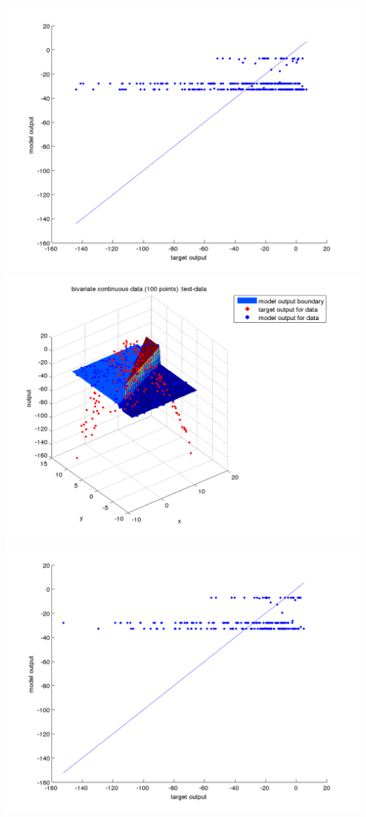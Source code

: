 \documentclass[fleqn]{article}
\begin{document}
\includegraphics[scale=0.4]{./pics/bivariate100/_2_4/_2_4_epoch_2_validation-data_scatter2d}
\includegraphics[scale=0.4]{./pics/bivariate100/_2_4/_2_4_epoch_2_test-data_scatter3d}
\includegraphics[scale=0.4]{./pics/bivariate100/_2_4/_2_4_epoch_2_test-data_scatter2d}
\end{document}
